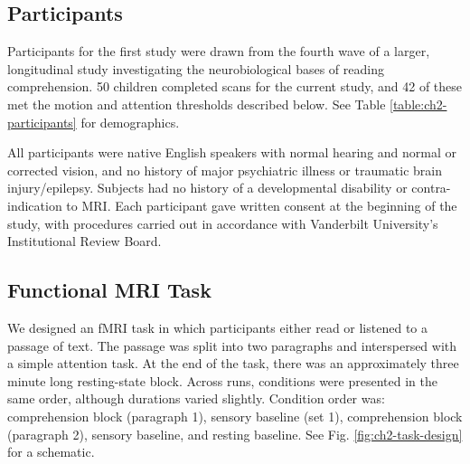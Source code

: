 \subsection{Participants}

Participants for the first study were drawn from the fourth wave of a larger, longitudinal study investigating the neurobiological bases of reading comprehension. 50 children completed scans for the current study, and 42 of these met the motion and attention thresholds described below. See Table \ref{table:ch2-participants} for demographics. 

All participants were native English speakers with normal hearing and normal or corrected vision, and no history of major psychiatric illness or traumatic brain injury/epilepsy. Subjects had no history of a developmental disability or contra-indication to MRI.  Each participant gave written consent at the beginning of the study, with procedures carried out in accordance with Vanderbilt University’s Institutional Review Board.

\begin{table}
	\scriptsize
	\renewcommand{\tabcolsep}{0.09cm}
	\centering
	
	\caption[Participant demographics for Study 1.]
	\label{table:ch2-participants}
\end{table}


\subsection{Functional MRI Task}

We designed an fMRI task in which participants either read or listened to a passage of text. The passage was split into two paragraphs and interspersed with a simple attention task. At the end of the task, there was an approximately three minute long resting-state block. Across runs, conditions were presented in the same order, although durations varied slightly. Condition order was: comprehension block (paragraph 1), sensory baseline (set 1), comprehension block (paragraph 2), sensory baseline, and resting baseline. See Fig. \ref{fig:ch2-task-design} for a schematic.

